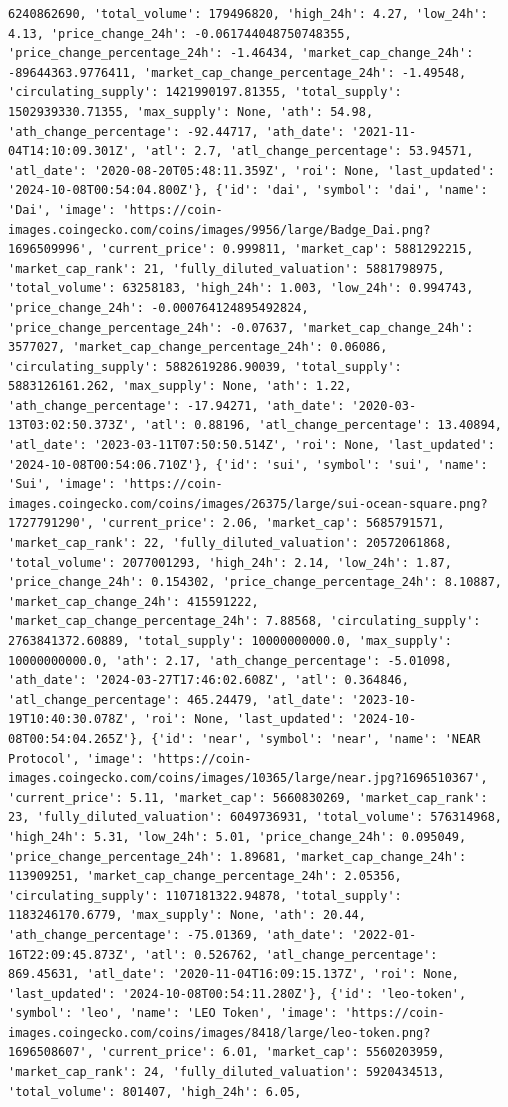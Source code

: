 \documentclass[
  letterpaper,
  DIV=11,
  numbers=noendperiod]{scrreprt}
\begin{document}
\begin{verbatim}
6240862690, 'total_volume': 179496820, 'high_24h': 4.27, 'low_24h': 4.13, 'price_change_24h': -0.061744048750748355, 'price_change_percentage_24h': -1.46434, 'market_cap_change_24h': -89644363.9776411, 'market_cap_change_percentage_24h': -1.49548, 'circulating_supply': 1421990197.81355, 'total_supply': 1502939330.71355, 'max_supply': None, 'ath': 54.98, 'ath_change_percentage': -92.44717, 'ath_date': '2021-11-04T14:10:09.301Z', 'atl': 2.7, 'atl_change_percentage': 53.94571, 'atl_date': '2020-08-20T05:48:11.359Z', 'roi': None, 'last_updated': '2024-10-08T00:54:04.800Z'}, {'id': 'dai', 'symbol': 'dai', 'name': 'Dai', 'image': 'https://coin-images.coingecko.com/coins/images/9956/large/Badge_Dai.png?1696509996', 'current_price': 0.999811, 'market_cap': 5881292215, 'market_cap_rank': 21, 'fully_diluted_valuation': 5881798975, 'total_volume': 63258183, 'high_24h': 1.003, 'low_24h': 0.994743, 'price_change_24h': -0.000764124895492824, 'price_change_percentage_24h': -0.07637, 'market_cap_change_24h': 3577027, 'market_cap_change_percentage_24h': 0.06086, 'circulating_supply': 5882619286.90039, 'total_supply': 5883126161.262, 'max_supply': None, 'ath': 1.22, 'ath_change_percentage': -17.94271, 'ath_date': '2020-03-13T03:02:50.373Z', 'atl': 0.88196, 'atl_change_percentage': 13.40894, 'atl_date': '2023-03-11T07:50:50.514Z', 'roi': None, 'last_updated': '2024-10-08T00:54:06.710Z'}, {'id': 'sui', 'symbol': 'sui', 'name': 'Sui', 'image': 'https://coin-images.coingecko.com/coins/images/26375/large/sui-ocean-square.png?1727791290', 'current_price': 2.06, 'market_cap': 5685791571, 'market_cap_rank': 22, 'fully_diluted_valuation': 20572061868, 'total_volume': 2077001293, 'high_24h': 2.14, 'low_24h': 1.87, 'price_change_24h': 0.154302, 'price_change_percentage_24h': 8.10887, 'market_cap_change_24h': 415591222, 'market_cap_change_percentage_24h': 7.88568, 'circulating_supply': 2763841372.60889, 'total_supply': 10000000000.0, 'max_supply': 10000000000.0, 'ath': 2.17, 'ath_change_percentage': -5.01098, 'ath_date': '2024-03-27T17:46:02.608Z', 'atl': 0.364846, 'atl_change_percentage': 465.24479, 'atl_date': '2023-10-19T10:40:30.078Z', 'roi': None, 'last_updated': '2024-10-08T00:54:04.265Z'}, {'id': 'near', 'symbol': 'near', 'name': 'NEAR Protocol', 'image': 'https://coin-images.coingecko.com/coins/images/10365/large/near.jpg?1696510367', 'current_price': 5.11, 'market_cap': 5660830269, 'market_cap_rank': 23, 'fully_diluted_valuation': 6049736931, 'total_volume': 576314968, 'high_24h': 5.31, 'low_24h': 5.01, 'price_change_24h': 0.095049, 'price_change_percentage_24h': 1.89681, 'market_cap_change_24h': 113909251, 'market_cap_change_percentage_24h': 2.05356, 'circulating_supply': 1107181322.94878, 'total_supply': 1183246170.6779, 'max_supply': None, 'ath': 20.44, 'ath_change_percentage': -75.01369, 'ath_date': '2022-01-16T22:09:45.873Z', 'atl': 0.526762, 'atl_change_percentage': 869.45631, 'atl_date': '2020-11-04T16:09:15.137Z', 'roi': None, 'last_updated': '2024-10-08T00:54:11.280Z'}, {'id': 'leo-token', 'symbol': 'leo', 'name': 'LEO Token', 'image': 'https://coin-images.coingecko.com/coins/images/8418/large/leo-token.png?1696508607', 'current_price': 6.01, 'market_cap': 5560203959, 'market_cap_rank': 24, 'fully_diluted_valuation': 5920434513, 'total_volume': 801407, 'high_24h': 6.05, 
\end{verbatim}
\end{document}

